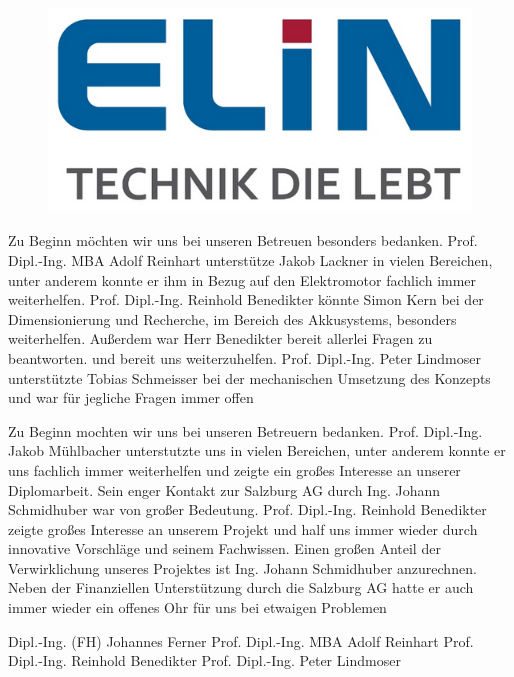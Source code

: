 \begin{figure}[H]
	\begin{center}
		\includegraphics[scale=0.7]{figures/allgemein/Elin Logo.png}
	\end{center}
\end{figure}
\vspace{1cm}

Zu Beginn möchten wir uns bei unseren Betreuen besonders bedanken. Prof. Dipl.-Ing. MBA Adolf Reinhart unterstütze Jakob Lackner in vielen Bereichen, unter anderem konnte er ihm in Bezug auf den Elektromotor fachlich immer weiterhelfen. Prof. Dipl.-Ing. Reinhold Benedikter könnte Simon Kern bei der Dimensionierung und Recherche, im Bereich des Akkusystems, besonders weiterhelfen. Außerdem war Herr Benedikter bereit allerlei Fragen zu beantworten. und bereit uns weiterzuhelfen. Prof. Dipl.-Ing. Peter Lindmoser unterstützte Tobias Schmeisser bei der mechanischen Umsetzung des Konzepts und war für jegliche Fragen immer offen

Zu Beginn mochten wir uns bei unseren Betreuern bedanken. Prof. Dipl.-Ing. Jakob Mühlbacher
unterstutzte uns in vielen Bereichen, unter anderem konnte er uns fachlich immer weiterhelfen
und zeigte ein großes Interesse an unserer Diplomarbeit. Sein enger Kontakt zur Salzburg AG
durch Ing. Johann Schmidhuber war von großer Bedeutung.
Prof. Dipl.-Ing. Reinhold Benedikter zeigte großes Interesse an unserem Projekt und half uns
immer wieder durch innovative Vorschläge und seinem Fachwissen.
Einen großen Anteil der Verwirklichung unseres Projektes ist Ing. Johann Schmidhuber anzurechnen. Neben der Finanziellen Unterstützung durch die Salzburg AG hatte er auch immer wieder
ein offenes Ohr für uns bei etwaigen Problemen

Dipl.-Ing. (FH) Johannes Ferner
Prof. Dipl.-Ing. MBA Adolf Reinhart
Prof. Dipl.-Ing. Reinhold Benedikter
Prof. Dipl.-Ing. Peter Lindmoser

